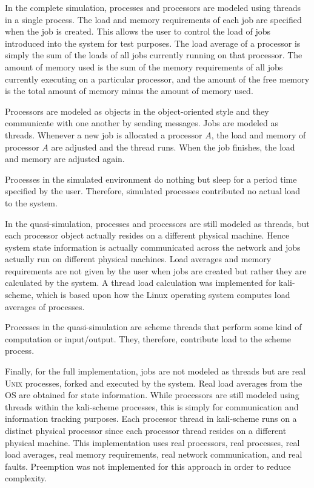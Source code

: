 \documentclass{report}
\newcommand{\UNIX}{\textsc{Unix}\xspace}
\begin{document}
In the complete simulation, processes and processors are modeled using
threads in a single process.  The load and memory requirements of each job
are specified when the job is created.  This allows the user to control
the load of jobs introduced into the system for test purposes.  The load
average of a processor is simply the sum of the loads of all jobs currently
running on that processor.  The amount of memory used is the sum of the
memory requirements of all jobs currently executing on a particular
processor, and the amount of the free memory is the total amount of memory
minus the amount of memory used.

Processors are modeled as objects in the object-oriented style and they
communicate with one another by sending messages.  Jobs are modeled as
threads.  Whenever a new job is allocated a processor $A$, the load and
memory of processor $A$ are adjusted and the thread runs.  When the job
finishes, the load and memory are adjusted again.

Processes in the simulated environment do nothing but sleep for a period
time specified by the user.  Therefore, simulated processes contributed no
actual load to the system.

In the quasi-simulation, processes and processors are still modeled as
threads, but each processor object actually resides on a different physical
machine.  Hence system state information is actually communicated across the
network and jobs actually run on different physical machines.  Load averages
and memory requirements are not given by the user when jobs are created but
rather they are calculated by the system.  A thread load calculation was
implemented for kali-scheme, which is based upon how the Linux operating
system computes load averages of processes.

Processes in the quasi-simulation are scheme threads that perform some kind
of computation or input/output.  They, therefore, contribute load to the
scheme process.

Finally, for the full implementation, jobs are not modeled as threads but
are real \UNIX processes, forked and executed by the system.  Real load
averages from the OS are obtained for state information.  While processors
are still modeled using threads within the kali-scheme processes, this is
simply for communication and information tracking purposes.  Each processor
thread in kali-scheme runs on a distinct physical processor since each
processor thread resides on a different physical machine.  This
implementation uses real processors, real processes, real load averages,
real memory requirements, real network communication, and real faults.
Preemption was not implemented for this approach in order to reduce
complexity.
\end{document}
